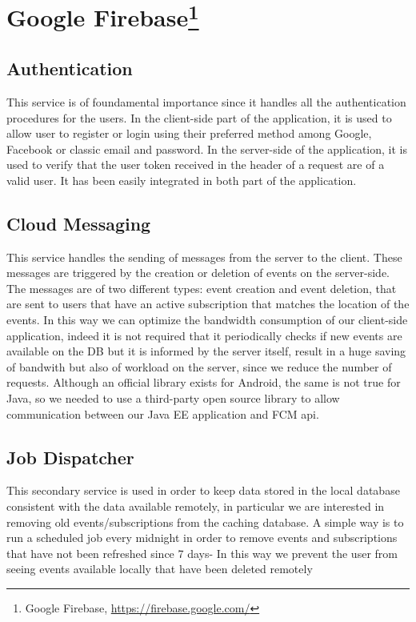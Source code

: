 \documentclass[a4paper]{scrreprt}
\begin{document}
\section[Google Firebase]{Google Firebase\footnote{Google Firebase, \url{https://firebase.google.com/}}}

\subsection{Authentication}
This service is of foundamental importance since it handles all the authentication procedures for the users. In the client-side part of the application, it is used to allow user to register or login using their preferred method among Google, Facebook or classic email and password. In the server-side of the application, it is used to verify that the user token received in the header of a request are of a valid user. It has been easily integrated in both part of the application.

\subsection{Cloud Messaging}
This service handles the sending of messages from the server to the client. These messages are triggered by the creation or deletion of events on the server-side. The messages are of two different types: event creation and event deletion, that are sent to users that have an active subscription that matches the location of the events. In this way we can optimize the bandwidth consumption of our client-side application, indeed it is not required that it periodically checks if new events are available on the DB but it is informed by the server itself, result in a huge saving of bandwith but also of workload on the server, since we reduce the number of requests. Although an official library exists for Android, the same is not true for Java, so we needed to use a third-party open source library to allow communication between our Java EE application and FCM api.

\subsection{Job Dispatcher}
This secondary service is used in order to keep data stored in the local database consistent with the data available remotely, in particular we are interested in removing old events/subscriptions from the caching database. A simple way is to run a scheduled job every midnight in order to remove events and subscriptions that have not been refreshed since 7 days- In this way we prevent the user from seeing events available locally that have been deleted remotely
\end{document}
